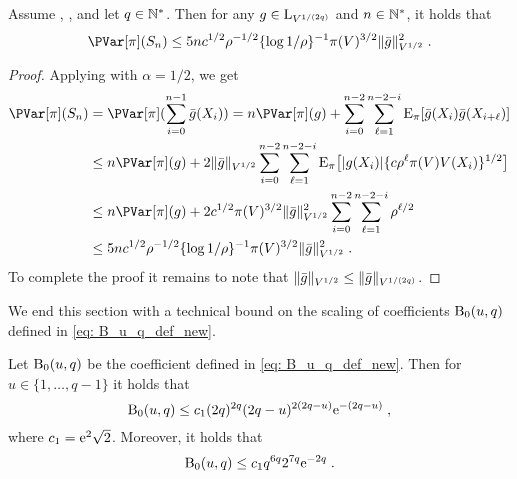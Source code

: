 \begin{lemma}
\label{lem:geom_ergodicity_variance_bound}
Assume , , and let $q \in \nsets$. Then for any $g \in \mrl_{V^{1/(2q)}}$ and $n \in \nsets$, it holds that 
\begin{equation}
\label{eq:var_bound}
\PVar[\pi](S_n) \leq 5 n c^{1/2} \ratev^{-1/2} \{\log{1/\ratev}\}^{-1} \pi(V)^{3/2} \Vnorm[V^{1/2}]{\bar{g}}^{2}\eqsp.
\end{equation}
\end{lemma}
\begin{proof}
Applying  with $\alpha = 1/2$, we get
\begin{align*}
\PVar[\pi](S_n) 
&= \PVar[\pi](\sum_{i=0}^{n-1}\bar{g}(X_i)) = n \PVar[\pi](g) + \sum_{i=0}^{n-2}\sum_{\ell=1}^{n-2-i}\PE_{\pi}[\bar{g}(X_i)\bar{g}(X_{i+\ell})] \\
&\leq n \PVar[\pi](g) + 2 \Vnorm[V^{1/2}]{\bar{g}} \sum_{i=0}^{n-2}\sum_{\ell=1}^{n-2-i}\PE_{\pi}\bigl[|g(X_{i})| \{c \ratev^{\ell} \pi(V) V(X_i)\}^{1/2}\bigr] \\
&\leq n \PVar[\pi](g) + 2 c^{1/2} \pi(V)^{3/2} \Vnorm[V^{1/2}]{\bar{g}}^{2} \sum_{i=0}^{n-2}\sum_{\ell=1}^{n-2-i} \ratev^{\ell/2} \\
&\leq 5 n c^{1/2} \ratev^{-1/2} \{\log{1/\ratev}\}^{-1} \pi(V)^{3/2} \Vnorm[V^{1/2}]{\bar{g}}^{2}\eqsp.
\end{align*}
To complete the proof it remains to note that $\Vnorm[V^{1/2}]{\bar{g}} \leq \Vnorm[V^{1/(2q)}]{\bar{g}}$.
\end{proof}
We end this section with a technical bound on the scaling of coefficients $\ConstB_{0}(u,q)$ defined in \eqref{eq: B_u_q_def_new}. 
\begin{lemma}
\label{lem:scale_B_gamma}
Let $\ConstB_{0}(u,q)$ be the coefficient defined in \eqref{eq: B_u_q_def_new}. Then for $u \in \{1,\ldots,q-1\}$ it holds that
\begin{equation}
\label{eq:non_unif_bound_B_u_q}
\ConstB_{0}(u,q) \leq c_{1} (2q)^{2q} (2q-u)^{2(2q-u)} \rme^{-(2q-u)}\eqsp,
\end{equation}
where $c_{1} = \rme^{2}\sqrt{2}$. Moreover, it holds that 
\[
\ConstB_{0}(u,q) \leq c_{1} q^{6q} 2^{7q} \rme^{-2q}\eqsp.
\]
\end{lemma}
